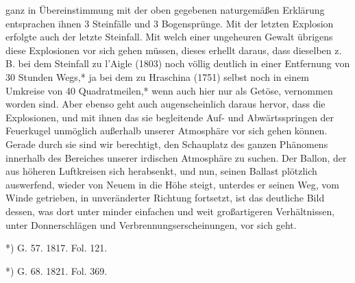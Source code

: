 \documentclass[a4paper, 8pt, oneside, polutonikogreek, german]{article}
\begin{document}
ganz in Übereinstimmung mit der oben gegebenen naturgemäßen Erklärung entsprachen ihnen 3 Steinfälle und 3 Bogensprünge. Mit der letzten Explosion erfolgte auch der letzte Steinfall. Mit welch einer ungeheuren Gewalt übrigens diese Explosionen vor sich gehen müssen, dieses erhellt daraus, dass dieselben z. B. bei dem Steinfall zu l'Aigle (1803) noch völlig deutlich in einer Entfernung von 30 Stunden Wegs,* ja bei dem zu Hraschina (1751) selbst noch in einem Umkreise von 40 Quadratmeilen,* wenn auch hier nur als Getöse, vernommen worden sind. Aber ebenso geht auch augenscheinlich daraus hervor, dass die Explosionen, und mit ihnen das sie begleitende Auf- und Abwärtsspringen der Feuerkugel unmöglich außerhalb unserer Atmosphäre vor sich gehen können. Gerade durch sie sind wir berechtigt, den Schauplatz des ganzen Phänomens innerhalb des Bereiches unserer irdischen Atmosphäre zu suchen. Der Ballon, der aus höheren Luftkreisen sich herabsenkt, und nun, seinen Ballast plötzlich auswerfend, wieder von Neuem in die Höhe steigt, unterdes er seinen Weg, vom Winde getrieben, in unveränderter Richtung fortsetzt, ist das deutliche Bild dessen, was dort unter minder einfachen und weit großartigeren Verhältnissen, unter Donnerschlägen und Verbrennungserscheinungen, vor sich geht.

*) G. 57. 1817. Fol. 121.

*) G. 68. 1821. Fol. 369.
\end{document}
